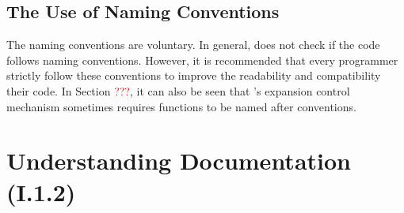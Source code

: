 \documentclass{ltugboat}
\begin{document}

\subsection{The Use of \LTT{} Naming Conventions}

The \LTT{} naming conventions are voluntary. 
In general, \LTT{} does not check if the code follows \LTT{} naming conventions.
However, it is recommended that every \LTT{} programmer strictly follow these conventions to improve the readability and compatibility their code.
In Section \textcolor{red}{???}, it can also be seen that \LTT{}'s expansion control mechanism sometimes requires functions to be named after \LTT{} conventions.


\section{Understanding \LTT{} Documentation (I.1.2)}
\end{document}
